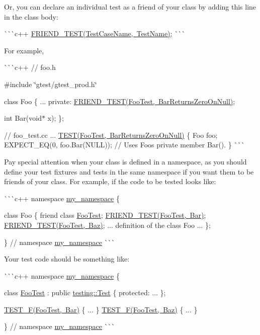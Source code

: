 \begin{DoxyItemize}
Or, you can declare an individual test as a friend of your class by adding this line in the class body\+:

\`{}\`{}\`{}c++ \mbox{\hyperlink{gtest__prod_8h_a8d443b4cc1d87a7a17943b8fbdbf3910}{F\+R\+I\+E\+N\+D\+\_\+\+T\+E\+S\+T(\+Test\+Case\+Name, Test\+Name)}}; \`{}\`{}\`{}

For example,

\`{}\`{}\`{}c++ // foo.\+h

\#include \char`\"{}gtest/gtest\+\_\+prod.\+h\char`\"{}

class Foo \{ ... private\+: \mbox{\hyperlink{gtest__prod_8h_a8d443b4cc1d87a7a17943b8fbdbf3910}{F\+R\+I\+E\+N\+D\+\_\+\+T\+E\+S\+T(\+Foo\+Test, Bar\+Returns\+Zero\+On\+Null)}};

int Bar(void$\ast$ x); \};

// foo\+\_\+test.\+cc ... \mbox{\hyperlink{gtest_8h_ad8b332753515c0ab8baada563c2547eb}{T\+E\+S\+T(\+Foo\+Test, Bar\+Returns\+Zero\+On\+Null)}} \{ Foo foo; E\+X\+P\+E\+C\+T\+\_\+\+EQ(0, foo.\+Bar(\+N\+U\+L\+L)); // Uses Foo\textquotesingle{}s private member Bar(). \} \`{}\`{}\`{}

Pay special attention when your class is defined in a namespace, as you should define your test fixtures and tests in the same namespace if you want them to be friends of your class. For example, if the code to be tested looks like\+:

\`{}\`{}\`{}c++ namespace \mbox{\hyperlink{namespacemy__namespace}{my\+\_\+namespace}} \{

class Foo \{ friend class \mbox{\hyperlink{classFooTest}{Foo\+Test}}; \mbox{\hyperlink{gtest__prod_8h_a8d443b4cc1d87a7a17943b8fbdbf3910}{F\+R\+I\+E\+N\+D\+\_\+\+T\+E\+S\+T(\+Foo\+Test, Bar)}}; \mbox{\hyperlink{gtest__prod_8h_a8d443b4cc1d87a7a17943b8fbdbf3910}{F\+R\+I\+E\+N\+D\+\_\+\+T\+E\+S\+T(\+Foo\+Test, Baz)}}; ... definition of the class Foo ... \};

\} // namespace \mbox{\hyperlink{namespacemy__namespace}{my\+\_\+namespace}} \`{}\`{}\`{}

Your test code should be something like\+:

\`{}\`{}\`{}c++ namespace \mbox{\hyperlink{namespacemy__namespace}{my\+\_\+namespace}} \{

class \mbox{\hyperlink{classFooTest}{Foo\+Test}} \+: public \mbox{\hyperlink{classtesting_1_1Test}{testing\+::\+Test}} \{ protected\+: ... \};

\mbox{\hyperlink{gtest_8h_a0ee66d464d1a06c20c1929cae09d8758}{T\+E\+S\+T\+\_\+\+F(\+Foo\+Test, Bar)}} \{ ... \} \mbox{\hyperlink{gtest_8h_a0ee66d464d1a06c20c1929cae09d8758}{T\+E\+S\+T\+\_\+\+F(\+Foo\+Test, Baz)}} \{ ... \}

\} // namespace \mbox{\hyperlink{namespacemy__namespace}{my\+\_\+namespace}} \`{}\`{}\`{}
\end{DoxyItemize}

